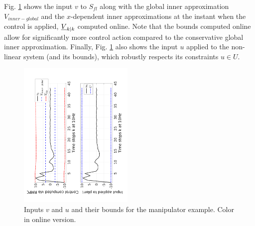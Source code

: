 



Fig. \ref{fig:v_and_limits} shows the input $v$ to $S_{fl}$ along with the global inner approximation $V_{inner-global}$ and the $x$-dependent inner approximations at the instant when the control is applied,  $\underline{V}_{k|k}$ computed online.
Note that the bounds computed online allow for significantly more control action compared to the conservative global inner approximation. 
Finally, Fig. \ref{fig:v_and_limits} also shows the input $u$ applied to the non-linear system (and its bounds), which robustly respects its constraints $u \in U$.



\begin{figure}
\includegraphics[angle=270,width=0.49\textwidth]{figs/u_and_v_manip.pdf}
\caption{Inputs $v$ and $u$ and their bounds for the manipulator example. Color in online version.}
\label{fig:v_and_limits}
\end{figure}



